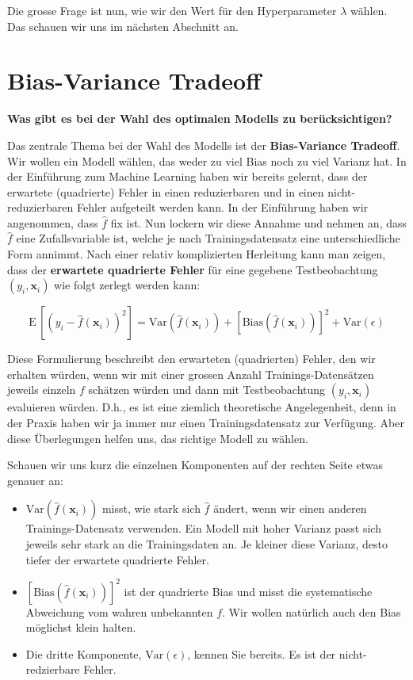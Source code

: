 \documentclass[
]{book}
\providecommand{\tightlist}{%
  \setlength{\itemsep}{0pt}\setlength{\parskip}{0pt}}
\begin{document}
Die grosse Frage ist nun, wie wir den Wert für den Hyperparameter \(\lambda\) wählen. Das schauen wir uns im nächsten Abschnitt an.

\hypertarget{bias-variance-tradeoff}{%
\section{Bias-Variance Tradeoff}\label{bias-variance-tradeoff}}

\textbf{Was gibt es bei der Wahl des optimalen Modells zu berücksichtigen?}

Das zentrale Thema bei der Wahl des Modells ist der \textbf{Bias-Variance Tradeoff}. Wir wollen ein Modell wählen, das weder zu viel Bias noch zu viel Varianz hat. In der Einführung zum Machine Learning haben wir bereits gelernt, dass der erwartete (quadrierte) Fehler in einen reduzierbaren und in einen nicht-reduzierbaren Fehler aufgeteilt werden kann. In der Einführung haben wir angenommen, dass \(\hat{f}\) fix ist. Nun lockern wir diese Annahme und nehmen an, dass \(\hat{f}\) eine Zufallsvariable ist, welche je nach Trainingsdatensatz eine unterschiedliche Form annimmt. Nach einer relativ komplizierten Herleitung kann man zeigen, dass der \textbf{erwartete quadrierte Fehler} für eine gegebene Testbeobachtung \((y_i,\mathbf{x}_i)\) wie folgt zerlegt werden kann:

\[
\text{E}\,\left[\left(y_i - \hat{f}(\mathbf{x}_i)\right)^2\right] = \text{Var}\left(\hat{f}(\mathbf{x}_i)\right) + \left[\text{Bias}\left(\hat{f}(\mathbf{x}_i)\right)\right]^2 + \text{Var}(\epsilon)
\]

Diese Formulierung beschreibt den erwarteten (quadrierten) Fehler, den wir erhalten würden, wenn wir mit einer grossen Anzahl Trainings-Datensätzen jeweils einzeln \(f\) schätzen würden und dann mit Testbeobachtung \((y_i,\mathbf{x}_i)\) evaluieren würden. D.h., es ist eine ziemlich theoretische Angelegenheit, denn in der Praxis haben wir ja immer nur einen Trainingsdatensatz zur Verfügung. Aber diese Überlegungen helfen uns, das richtige Modell zu wählen.

Schauen wir uns kurz die einzelnen Komponenten auf der rechten Seite etwas genauer an:

\begin{itemize}
\tightlist
\item
  \(\text{Var}\left(\hat{f}(\mathbf{x}_i)\right)\) misst, wie stark sich \(\hat{f}\) ändert, wenn wir einen anderen Trainings-Datensatz verwenden. Ein Modell mit hoher Varianz passt sich jeweils sehr stark an die Trainingsdaten an. Je kleiner diese Varianz, desto tiefer der erwartete quadrierte Fehler.
\item
  \(\left[\text{Bias}\left(\hat{f}(\mathbf{x}_i)\right)\right]^2\) ist der quadrierte Bias und misst die systematische Abweichung vom wahren unbekannten \(f\). Wir wollen natürlich auch den Bias möglichst klein halten.
\item
  Die dritte Komponente, \(\text{Var}(\epsilon)\), kennen Sie bereits. Es ist der nicht-redzierbare Fehler.
\end{itemize}
\end{document}
